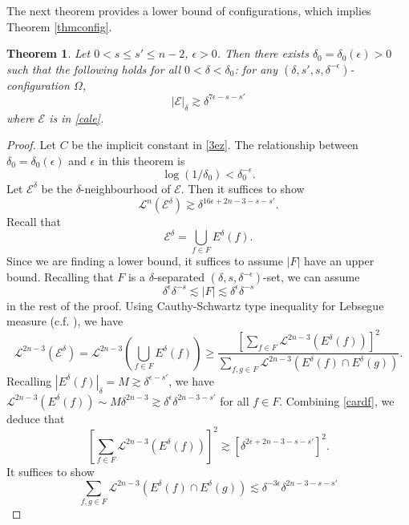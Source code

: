 \documentclass[11pt,a4paper,reqno]{amsart}
\newcommand{\calE}{\mathcal{E}}
\newcommand{\1}{\mathbf{1}}
\numberwithin{equation}{section}
\theoremstyle{plain}
\newtheorem{thm}[equation]{Theorem}
\theoremstyle{definition}
\theoremstyle{remark}
\begin{document}
The next theorem provides a lower bound of configurations, which implies Theorem \ref{thmconfig}.


\begin{thm} \label{deltaconfig}
  Let $0<s  \le s' \le n-2$, $\epsilon>0$. Then there exists $\delta_0=\delta_0(\epsilon)>0$ such that the following holds for all $0 < \delta < \delta_0$: for any $(\delta,s',s,\delta^{-\epsilon})$-configuration $\Omega$,
  $$   |\calE|_{\delta} \gtrsim \delta^{7\epsilon-s-s'}$$
  where $\calE$ is in \eqref{cale}.
\end{thm}
\begin{proof}
  Let $C$ be the implicit constant in \eqref{3ez}. The relationship between $\delta_0=\delta_0(\epsilon)$ and $\epsilon$ in this theorem is
  \begin{equation}\label{4ez}
    \log(1/\delta_0) < \delta_0^{-\epsilon}.
  \end{equation}
  Let $\mathcal{E}^\delta$ be the $\delta$-neighbourhood of $\mathcal{E}$. Then it suffices to show $$\mathcal{L}^n(\mathcal{E}^\delta) \gtrsim \delta^{16\epsilon +2n-3- s-s'}.$$
  Recall that
  $$  \mathcal{E}^\delta =  \bigcup_{f \in F} E^\delta(f).$$
  Since we are finding a lower bound, it suffices to assume $|F|$ have an upper bound. Recalling that $F$ is a $\delta$-separated $(\delta,s,\delta^{-\epsilon})$-set, we can assume
  \begin{equation}\label{cardf}
    \delta^{\epsilon} \delta^{-s}\lesssim |F|\lesssim \delta^{\epsilon} \delta^{-s}
  \end{equation}
  in the rest of the proof.
  Using Cauthy-Schwartz type inequality for Lebsegue measure (c.f. \cite[Lemma4.2]{LIU2025}), we have
  \begin{equation}\label{cs}
    \mathcal{L}^{2n-3}(\mathcal{E}^\delta) =  \mathcal{L}^{2n-3}(\bigcup_{f \in F} E^\delta(f)) \ge \frac{[\sum_{f \in F}\mathcal{L}^{2n-3}( E^\delta(f))]^2}{\sum_{f ,g\in F}\mathcal{L}^{2n-3}( E^\delta(f)\cap  E^\delta(g))}.
  \end{equation}
  Recalling $|E^\delta(f)|_{\delta}=M \gtrsim \delta^{\epsilon-s'}$, we have
  $ \mathcal{L}^{2n-3}(E^\delta(f)) \sim M \delta^{2n-3} \gtrsim \delta^{\epsilon} \delta^{2n-3-s'}$ for all $f \in F$. Combining \eqref{cardf}, we deduce that
  $$ [\sum_{f \in F}\mathcal{L}^{2n-3}( E^\delta(f))]^2 \gtrsim [ \delta^{2\epsilon +2n-3 -s-s'} ]^2.  $$
  It suffices to show
  \begin{equation}\label{e2}
    \sum_{f ,g\in F}\mathcal{L}^{2n-3}( E^\delta(f)\cap  E^\delta(g)) \lesssim \delta^{-3\epsilon}\delta^{2n-3-s-s'}

\end{equation}
\end{proof}
\end{document}
